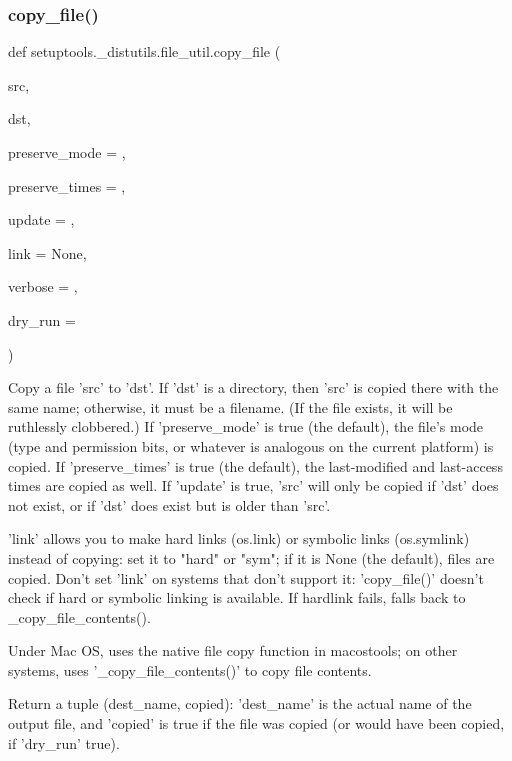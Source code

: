 \subsubsection{\texorpdfstring{copy\+\_\+file()}{copy\_file()}}
{\footnotesize\ttfamily def setuptools.\+\_\+distutils.\+file\+\_\+util.\+copy\+\_\+file (\begin{DoxyParamCaption}\item[{}]{src,  }\item[{}]{dst,  }\item[{}]{preserve\+\_\+mode = {},  }\item[{}]{preserve\+\_\+times = {},  }\item[{}]{update = {},  }\item[{}]{link = {\ttfamily None},  }\item[{}]{verbose = {},  }\item[{}]{dry\+\_\+run = {} }\end{DoxyParamCaption})}

\begin{DoxyVerb}Copy a file 'src' to 'dst'.  If 'dst' is a directory, then 'src' is
copied there with the same name; otherwise, it must be a filename.  (If
the file exists, it will be ruthlessly clobbered.)  If 'preserve_mode'
is true (the default), the file's mode (type and permission bits, or
whatever is analogous on the current platform) is copied.  If
'preserve_times' is true (the default), the last-modified and
last-access times are copied as well.  If 'update' is true, 'src' will
only be copied if 'dst' does not exist, or if 'dst' does exist but is
older than 'src'.

'link' allows you to make hard links (os.link) or symbolic links
(os.symlink) instead of copying: set it to "hard" or "sym"; if it is
None (the default), files are copied.  Don't set 'link' on systems that
don't support it: 'copy_file()' doesn't check if hard or symbolic
linking is available. If hardlink fails, falls back to
_copy_file_contents().

Under Mac OS, uses the native file copy function in macostools; on
other systems, uses '_copy_file_contents()' to copy file contents.

Return a tuple (dest_name, copied): 'dest_name' is the actual name of
the output file, and 'copied' is true if the file was copied (or would
have been copied, if 'dry_run' true).
\end{DoxyVerb}
 \mbox{\label{namespacesetuptools_1_1__distutils_1_1file__util_ad239e74ae79729a1aa85caf53617796c}} 
